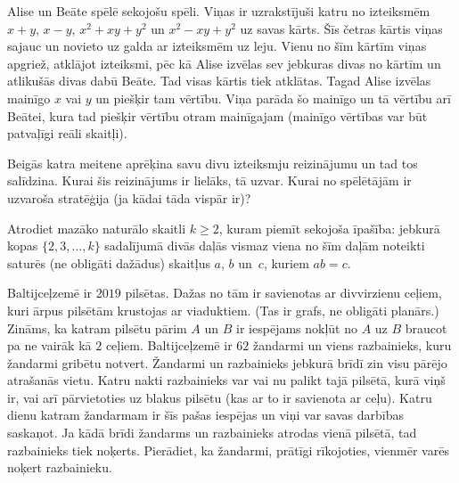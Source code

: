 



\renewcommand{\theenumi}{\alph{enumi}}



\noindent
 
\filbreak

\begin{problem}
Alise un Beāte spēlē sekojošu spēli. Viņas ir uzrakstījuši katru no izteiksmēm $x+y$, $x-y$, $x^2+xy+y^2$ un $x^2-xy+y^2$ uz savas kārts. Šīs četras kārtis viņas sajauc un novieto uz galda ar izteiksmēm uz leju. Vienu no šīm kārtīm viņas apgriež, atklājot izteiksmi, pēc kā Alise izvēlas sev jebkuras divas no kārtīm un atlikušās divas dabū Beāte. Tad visas kārtis tiek atklātas. Tagad Alise izvēlas mainīgo $x$ vai $y$ un piešķir tam vērtību. Viņa parāda šo mainīgo un tā vērtību arī Beātei, kura tad piešķir vērtību otram mainīgajam (mainīgo vērtības var būt patvaļīgi reāli skaitļi).

Beigās katra meitene aprēķina savu divu izteiksmju reizinājumu un tad tos salīdzina. Kurai šis reizinājums ir lielāks, tā uzvar.
Kurai no spēlētājām ir uzvaroša stratēģija (ja kādai tāda vispār ir)?
\end{problem}

\begin{problem}
Atrodiet mazāko naturālo skaitli $k\geq 2$, kuram piemīt sekojoša īpašība:
jebkurā kopas $\{2,3,\ldots,k\}$ \mbox{sadalījumā} divās daļās vismaz viena no šīm daļām noteikti saturēs
(ne obligāti dažādus) skaitļus $a$, $b$ un~$c$,
kuriem $ab=c$.
\end{problem}

\begin{problem}
Baltijceļzemē ir $2019$ pilsētas. Dažas no tām ir savienotas ar divvirzienu ceļiem, kuri ārpus pilsētām krustojas ar viaduktiem. (Tas ir grafs, ne obligāti planārs.)  
Zināms, ka katram pilsētu pārim $A$ un $B$ ir iespējams nokļūt no $A$ uz $B$ braucot pa ne vairāk kā $2$ ceļiem.
Baltijceļzemē ir $62$ žandarmi un viens razbainieks, kuru žandarmi gribētu notvert.
Žandarmi un razbainieks jebkurā brīdī zin visu pārējo atrašanās vietu.
Katru nakti razbainieks var vai nu palikt tajā pilsētā, kurā viņš ir, vai arī pārvietoties uz blakus pilsētu (kas ar to ir savienota ar ceļu).
Katru dienu katram žandarmam ir šīs pašas iespējas un viņi var savas darbības saskaņot.
Ja kādā brīdi žandarms un razbainieks atrodas vienā pilsētā, tad razbainieks tiek noķerts.
Pierādiet, ka žandarmi, prātīgi rīkojoties, vienmēr varēs noķert razbainieku.
\end{problem}

